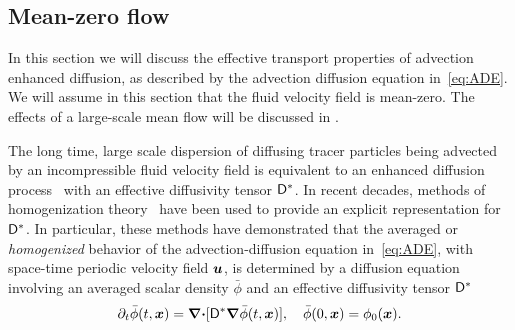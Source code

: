 \documentclass[amsa]{ipart}
\begin{document}
\subsection{Mean-zero flow}\label{sec:Mean_zero_flow}
%
In this section we will discuss the effective transport properties of
advection enhanced diffusion, as described by the advection diffusion
equation in~\eqref{eq:ADE}. We will assume in this section that the
fluid velocity field is mean-zero. The effects of a large-scale mean
flow will be discussed in . 




The long time, large scale dispersion of diffusing tracer particles
being advected by an incompressible fluid velocity field is equivalent
to an enhanced diffusion process~\cite{Taylor:PRSL:196} with an
effective diffusivity tensor $\mathsf{D}^*$. In recent decades, methods of
homogenization
theory~\cite{McLaughlin:SIAM_JAM:780,Fannjiang:1994:SIAM_JAM:333,Novikov:2005:CPAM:867,Majda:Kramer:1999:book}
have been used to provide an explicit representation for
$\mathsf{D}^*$. In particular, these methods have demonstrated that the
averaged or \emph{homogenized} behavior of the advection-diffusion
equation in~\eqref{eq:ADE}, with space-time periodic velocity field
$\boldsymbol{u}$, is determined by a diffusion equation
involving an averaged scalar density $\bar{\phi}$ and an
effective diffusivity tensor
$\mathsf{D}^*$~\cite{Majda:Kramer:1999:book}       
%
\begin{align}\label{eq:phi_bar}
 \partial_t\bar{\phi}(t,\vecx)=\bnabla\bcdot[\Dm^*\bnabla \bar{\phi}(t,\vecx)], \quad
  \bar{\phi}(0,\vecx)=\phi_0(\vecx).
\end{align}
\end{document}
